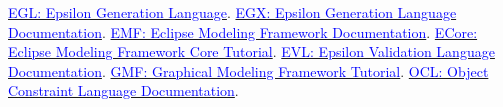\documentclass[a4paper,11pt]{report}
\begin{document}
\begin{thebibliography}{99}
	
 \href{https://eclipse.dev/modeling/emf/docs/}{\textcolor{blue}{EGL: Epsilon Generation Language}}.
 \href{https://eclipse.dev/epsilon/doc/egx/}{\textcolor{blue}{EGX: Epsilon Generation Language Documentation}}.
 \href{https://eclipse.dev/modeling/emf/docs/}{\textcolor{blue}{EMF: Eclipse Modeling Framework Documentation}}.
 \href{https://eclipsesource.com/blogs/tutorials/emf-tutorial/}{\textcolor{blue}{ECore: Eclipse Modeling Framework Core Tutorial}}.
 \href{https://eclipse.dev/epsilon/doc/evl/}{\textcolor{blue}{EVL: Epsilon Validation Language Documentation}}.
  \href{https://wiki.eclipse.org/Graphical_Modeling_Framework/Tutorial/Part_1}{\textcolor{blue}{GMF: Graphical Modeling Framework Tutorial}}.
  \href{https://download.eclipse.org/ocl/doc/5.0.0/ocl.pdf}{\textcolor{blue}{OCL: Object Constraint Language Documentation}}.

\end{thebibliography}


\end{document}
